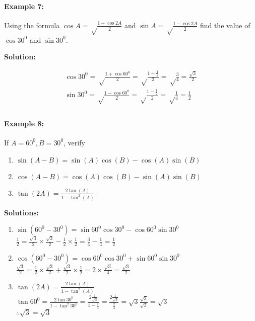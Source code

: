 \documentclass{article}
\begin{document}
\paragraph{Example 7:}
Using the formula $\cos A = \sqrt\frac{1+\cos2A}{2}$ and $\sin A = \sqrt\frac{1-\cos2A}{2}$
find the value of $\cos30^{0}$ and $\sin30^{0}$.

{\scriptsize \textbf{Solution:}}

\[
  \begin{aligned}
    \cos30^{0} = \sqrt\frac{1+\cos60^{0}}{2} =  \sqrt\frac{1+\frac{1}{2}}{2} = \sqrt\frac{3}{4} = \frac{\sqrt{3}}{2} \\
    \sin30^{0} = \sqrt\frac{1-\cos60^{0}}{2} =  \sqrt\frac{1-\frac{1}{2}}{2} = \sqrt\frac{1}{4} = \frac{1}{2} \\
  \end{aligned}
\]

\paragraph{Example 8:}
If $A = 60^{0}, B = 30^{0}$, verify

\begin{enumerate}[label=\alph*)]
  \item $\sin(A-B) = \sin(A) \cos(B) - \cos(A) \sin(B)$
  \item $\cos(A-B) = \cos(A) \cos(B) - \sin(A) \sin(B)$
  \item $\tan(2A) = \frac{2\tan(A)}{1-\tan^{2}(A)}$
\end{enumerate}

{\scriptsize \textbf{Solutions:}}

\begin{enumerate}[label=\alph*)]
  \item $\sin(60^{0}-30^{0}) = \sin60^{0}\cos30^{0} - \cos60^{0}\sin30^{0}$ \\
        $ \frac{1}{2} = \frac{\sqrt{3}}{2} \times \frac{\sqrt{3}}{2} - \frac{1}{2} \times \frac{1}{2} = \frac{3}{4} - \frac{1}{4} = \frac{1}{2} $
  \item $\cos(60^{0}-30^{0}) = \cos60^{0}\cos30^{0} + \sin60^{0}\sin30^{0}$ \\
        $ \frac{\sqrt{3}}{2} = \frac{1}{2} \times \frac{\sqrt{3}}{2} + \frac{\sqrt{3}}{2} \times \frac{1}{2} = 2 \times \frac{\sqrt{3}}{4} = \frac{\sqrt{3}}{2}$
  \item $\tan(2A) = \frac{2\tan(A)}{1-\tan^{2}(A)}$ \\
        $ \tan 60^{0} = \frac{2\tan30^{0}}{1-\tan^{2}30^{0}} = \frac{2\frac{1}{\sqrt{3}}}{1-\frac{1}{3}} = \frac{2\frac{1}{\sqrt{3}}}{\frac{2}{3}} = \sqrt{3} \frac{\sqrt{3}}{\sqrt{3}} = \sqrt{3}$ \\
        $\therefore \sqrt{3} = \sqrt{3}$
\end{enumerate}
\end{document}

